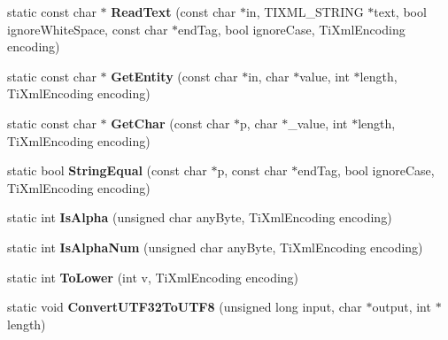 \begin{DoxyCompactItemize}
\item 
\hypertarget{class_ti_xml_base_a7f9beef90db30fa63dd35b3f992a30ca}{static const char $\ast$ {\bfseries Read\+Text} (const char $\ast$in, T\+I\+X\+M\+L\+\_\+\+S\+T\+R\+I\+N\+G $\ast$text, bool ignore\+White\+Space, const char $\ast$end\+Tag, bool ignore\+Case, Ti\+Xml\+Encoding encoding)}\label{class_ti_xml_base_a7f9beef90db30fa63dd35b3f992a30ca}

\item 
\hypertarget{class_ti_xml_base_a44f75cc7a45a97a09e509dc4c8c127e0}{static const char $\ast$ {\bfseries Get\+Entity} (const char $\ast$in, char $\ast$value, int $\ast$length, Ti\+Xml\+Encoding encoding)}\label{class_ti_xml_base_a44f75cc7a45a97a09e509dc4c8c127e0}

\item 
\hypertarget{class_ti_xml_base_a5b0fde72d6f662ae1fd6303195d2159b}{static const char $\ast$ {\bfseries Get\+Char} (const char $\ast$p, char $\ast$\+\_\+value, int $\ast$length, Ti\+Xml\+Encoding encoding)}\label{class_ti_xml_base_a5b0fde72d6f662ae1fd6303195d2159b}

\item 
\hypertarget{class_ti_xml_base_ad668006b550c011d05072dd4fc16577d}{static bool {\bfseries String\+Equal} (const char $\ast$p, const char $\ast$end\+Tag, bool ignore\+Case, Ti\+Xml\+Encoding encoding)}\label{class_ti_xml_base_ad668006b550c011d05072dd4fc16577d}

\item 
\hypertarget{class_ti_xml_base_ac95c7391b56770ff134644b1d74a1a4e}{static int {\bfseries Is\+Alpha} (unsigned char any\+Byte, Ti\+Xml\+Encoding encoding)}\label{class_ti_xml_base_ac95c7391b56770ff134644b1d74a1a4e}

\item 
\hypertarget{class_ti_xml_base_ae85b1b5e0351c80f2d795ca7005e79b7}{static int {\bfseries Is\+Alpha\+Num} (unsigned char any\+Byte, Ti\+Xml\+Encoding encoding)}\label{class_ti_xml_base_ae85b1b5e0351c80f2d795ca7005e79b7}

\item 
\hypertarget{class_ti_xml_base_a799f17405a86a5c2029618e85f11a097}{static int {\bfseries To\+Lower} (int v, Ti\+Xml\+Encoding encoding)}\label{class_ti_xml_base_a799f17405a86a5c2029618e85f11a097}

\item 
\hypertarget{class_ti_xml_base_ad2b292fa401b8a5b8e6536de9261a3bb}{static void {\bfseries Convert\+U\+T\+F32\+To\+U\+T\+F8} (unsigned long input, char $\ast$output, int $\ast$length)}\label{class_ti_xml_base_ad2b292fa401b8a5b8e6536de9261a3bb}

\end{DoxyCompactItemize}
